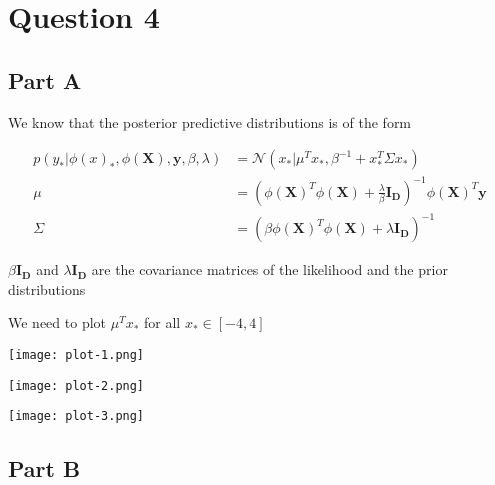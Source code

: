 \documentclass{article}
\begin{document}
\section*{Question 4}
\begin{addmargin}{1.5em}
    
    \subsection*{Part A}
    \begin{addmargin}{1.5em}
        
        We know that the posterior predictive distributions is of the form
        
        \begin{align*}
            p(y_* | \phi(x)_*, \phi(\boldsymbol{X}), \boldsymbol{y}, \beta, \lambda) &= \mathcal{N}(x_* | \mu^Tx_*, \beta^{-1} + x_*^T \Sigma x_*) \\
            \mu                                                                      &= (\phi(\boldsymbol{X})^T\phi(\boldsymbol{X}) + \frac{\lambda}{\beta}\boldsymbol{I_D})^{-1}\phi(\boldsymbol{X})^T\boldsymbol{y} \\
            \Sigma                                                                   &= (\beta\phi(\boldsymbol{X})^T\phi(\boldsymbol{X}) + \lambda\boldsymbol{I_D})^{-1}
        \end{align*}
        
        $\beta\boldsymbol{I_D}$ and $\lambda\boldsymbol{I_D}$ are the covariance matrices of the likelihood and the prior distributions
        
        We need to plot $\mu^T x_*$ for all $x_* \in [-4, 4]$
        
        \begin{center}
        
            \texttt{[image: plot-1.png]}
            
            \texttt{[image: plot-2.png]}
            
            \texttt{[image: plot-3.png]}
        
        \end{center}
        
    \end{addmargin}
    
    \subsection*{Part B}
    \begin{addmargin}{1.5em}
        

\end{addmargin}
\end{addmargin}
\end{document}
